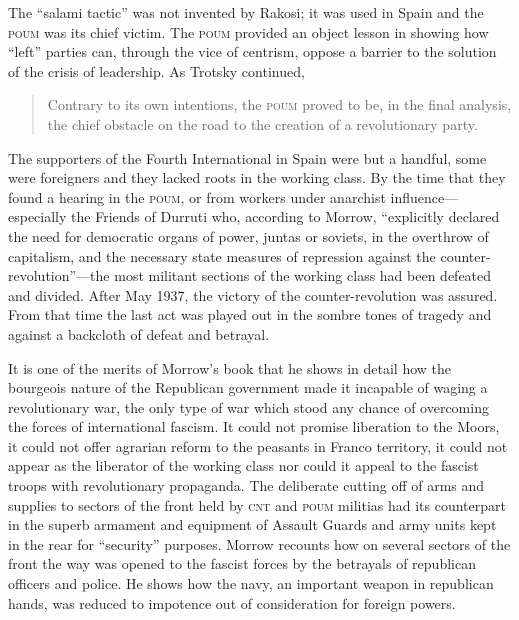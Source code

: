 The ``salami tactic'' was not invented by Rakosi; it was used in Spain and the \textsc{poum} was its chief victim. The \textsc{poum} provided an object lesson in showing how ``left'' parties can, through the vice of centrism, oppose a barrier to the solution of the crisis of leadership. As Trotsky continued,

\begin{quotation}
  Contrary to its own intentions, the \textsc{poum} proved to be, in the final analysis, the chief obstacle on the road to the creation of a revolutionary party.
\end{quotation}

The supporters of the Fourth International in Spain were but a handful, some were foreigners and they lacked roots in the working class. By the time that they found a hearing in the \textsc{poum}, or from workers under anarchist influence---especially the Friends of Durruti who, according to Morrow, ``explicitly declared the need for democratic organs of power, juntas or soviets, in the overthrow of capitalism, and the necessary state measures of repression against the counter-revolution''---the most militant sections of the working class had been defeated and divided. After May 1937, the victory of the counter-revolution was assured. From that time the last act was played out in the sombre tones of tragedy and against a backcloth of defeat and betrayal.

It is one of the merits of Morrow’s book that he shows in detail how the bourgeois nature of the Republican government made it incapable of waging a revolutionary war, the only type of war which stood any chance of overcoming the forces of international fascism. It could not promise liberation to the Moors, it could not offer agrarian reform to the peasants in Franco territory, it could not appear as the liberator of the working class nor could it appeal to the fascist troops with revolutionary propaganda. The deliberate cutting off of arms and supplies to sectors of the front held by \textsc{cnt} and \textsc{poum} militias had its counterpart in the superb armament and equipment of Assault Guards and army units kept in the rear for ``security'' purposes. Morrow recounts how on several sectors of the front the way was opened to the fascist forces by the betrayals of republican officers and police. He shows how the navy, an important weapon in republican hands, was reduced to impotence out of consideration for foreign powers.

